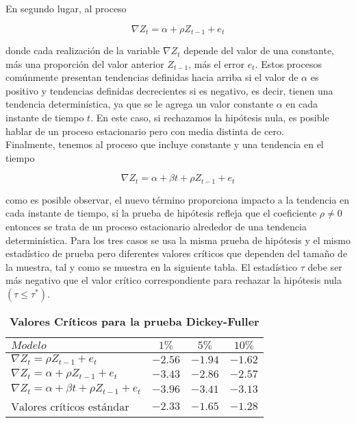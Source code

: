 En segundo lugar, al proceso

 \begin{equation}
 \nabla Z_t= \alpha +  \rho Z_{t-1}+e_t
 \end{equation}
 
donde cada realización de la variable $\nabla Z_t$ depende del valor de una constante, más una proporción del valor anterior $Z_{t-1}$, más el error $e_t$. Estos procesos comúnmente presentan tendencias definidas hacia arriba si el valor de $\alpha$ es positivo y tendencias definidas decrecientes si es negativo, es decir, tienen una tendencia determinística, ya que se le agrega un valor constante $\alpha$ en cada instante de tiempo $t$. En este caso, si rechazamos la hipótesis nula, es posible hablar de un proceso estacionario pero con media distinta de cero.\\

Finalmente, tenemos al proceso que incluye constante y una tendencia en el tiempo

 \begin{equation}
 \nabla Z_t= \alpha + \beta t + \rho Z_{t-1}+e_t
 \end{equation}
 
como es posible observar, el nuevo término proporciona impacto a la tendencia en cada instante de tiempo, si la prueba de hipótesis refleja que el coeficiente $\rho \neq 0$ entonces se trata de un proceso estacionario alrededor de una tendencia determinística. Para los tres casos se usa la misma prueba de hipótesis y  el mismo estadístico de prueba pero diferentes valores críticos que dependen del tamaño de la muestra, tal y como se muestra en la siguiente tabla. El estadístico $\tau$ debe ser más negativo que el valor crítico correspondiente para rechazar la hipótesis nula $(\tau \leq \tau^*)$.\\


\begin{table}[ht]
\caption{\textbf{Valores Críticos para la prueba Dickey-Fuller}}
\centering
   \begin{tabular}{lccc}
    $Modelo$                                               &  $1\%$    &  $5\%$    & $10\%$   \\
    \hline
    $\nabla Z_t =\rho Z_{t-1} + e_t$                     &  $-2.56$ & $-1.94$ & $-1.62$ \\
    $\nabla Z_t = \alpha + \rho Z_{t-1} + e_t$            &  $-3.43$ & $-2.86$ & $-2.57$ \\
    $\nabla Z_t = \alpha + \beta t + \rho Z_{t-1} + e_t$ & $-3.96$ & $-3.41$ & $-3.13$ \\
    \hline
    $\text{Valores}$  $\text{críticos}$ $\text{estándar}$                         & $-2.33$ & $-1.65$ & $-1.28$ \\
    \hline
    \end{tabular}
\label{table:CVDF}
\end{table}


